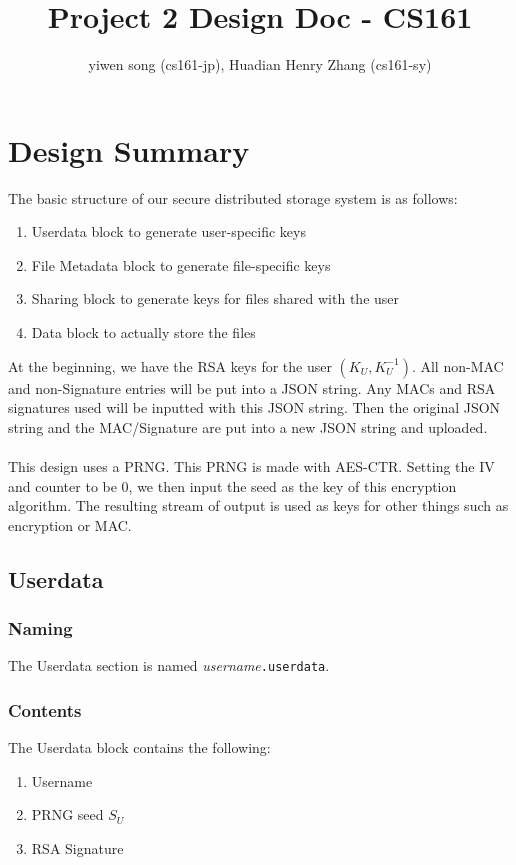 \documentclass{article}
\title{Project 2 Design Doc - CS161}
\author{yiwen song (cs161-jp), Huadian Henry Zhang (cs161-sy)}
\date{}
\begin{document}
\maketitle

\section{Design Summary}
The basic structure of our secure distributed storage system is as follows:
\begin{enumerate}
\item Userdata block to generate user-specific keys
\item File Metadata block to generate file-specific keys
\item Sharing block to generate keys for files shared with the user
\item Data block to actually store the files
\end{enumerate}
At the beginning, we have the RSA keys for the user $(K_U, K_U^{-1})$.
All non-MAC and non-Signature entries will be put into a JSON string.
Any MACs and RSA signatures used will be inputted with this JSON string.
Then the original JSON string and the MAC/Signature are put into a new JSON string and uploaded.
\\ \\
This design uses a PRNG.
This PRNG is made with AES-CTR.
Setting the IV and counter to be 0, we then input the seed as the key of this encryption algorithm.
The resulting stream of output is used as keys for other things such as encryption or MAC.

\subsection{Userdata}
\subsubsection{Naming}
The Userdata section is named \textit{username}\texttt{.userdata}.

\subsubsection{Contents}
The Userdata block contains the following:
\begin{enumerate}
\item Username
\item PRNG seed $S_U$
\item RSA Signature
\end{enumerate}
\end{document}
